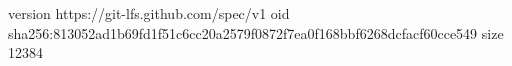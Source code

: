 version https://git-lfs.github.com/spec/v1
oid sha256:813052ad1b69fd1f51c6cc20a2579f0872f7ea0f168bbf6268dcfacf60cce549
size 12384
